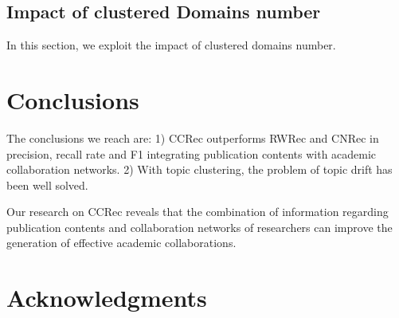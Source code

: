 \documentclass{acm_proc_article-sp}
\begin{document}
\subsection{Impact of clustered Domains number}
In this section, we exploit the impact of clustered domains number.

\section{Conclusions}
The conclusions we reach are: 1) CCRec outperforms RWRec and CNRec in precision, recall rate and F1 integrating publication contents with academic collaboration networks. 2) With topic clustering, the problem of topic drift has been well solved.

Our research on CCRec reveals that the combination of information regarding publication contents and collaboration networks of researchers can improve the generation of effective academic collaborations.

\section{Acknowledgments}



\balancecolumns
\end{document}
